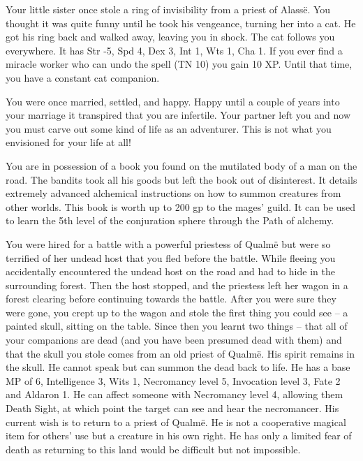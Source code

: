 \begin{multicols}{2}
\begin{list}{\addtocounter{list}{1}\textbf{:}}{\raggedleft}
\item{Your little sister once stole a ring of invisibility from a priest of Alass\"{e}.  You thought it was quite funny until he took his vengeance, turning her into a cat.  He got his ring back and walked away, leaving you in shock.  The cat follows you everywhere.  It has Str -5, Spd 4, Dex 3, Int 1, Wts 1, Cha 1.  If you ever find a miracle worker who can undo the spell (TN 10) you gain 10 XP.  Until that time, you have a constant cat companion.}

\item{You were once married, settled, and happy.  Happy until a couple of years into your marriage it transpired that you are infertile.  Your partner left you and now you must carve out some kind of life as an adventurer.  This is not what you envisioned for your life at all!}

\item{You are in possession of a book you found on the mutilated body of a man on the road.  The bandits took all his goods but left the book out of disinterest.  It details extremely advanced alchemical instructions on how to summon creatures from other worlds.  This book is worth up to 200 gp to the mages' guild.  It can be used to learn the 5th level of the conjuration sphere through the Path of alchemy.}

\item{You were hired for a battle with a powerful priestess of Qualm\"{e} but were so terrified of her undead host that you fled before the battle.  While fleeing you accidentally encountered the undead host on the road and had to hide in the surrounding forest.  Then the host stopped, and the priestess left her wagon in a forest clearing before continuing towards the battle. After you were sure they were gone, you crept up to the wagon and stole the first thing you could see -- a painted skull, sitting on the table.  Since then you learnt two things -- that all of your companions are dead (and you have been presumed dead with them) and that the skull you stole comes from an old priest of Qualm\"{e}.  His spirit remains in the skull.  He cannot speak but can summon the dead back to life.  He has a base MP of 6, Intelligence 3, Wits 1, Necromancy level 5, Invocation level 3, Fate 2 and Aldaron 1.  He can affect someone with Necromancy level 4, allowing them Death Sight, at which point the target can see and hear the necromancer.  His current wish is to return to a priest of Qualm\"{e}.  He is not a cooperative magical item for others' use but a creature in his own right.  He has only a limited fear of death as returning to this land would be difficult but not impossible.}


\end{list}
\end{multicols}
